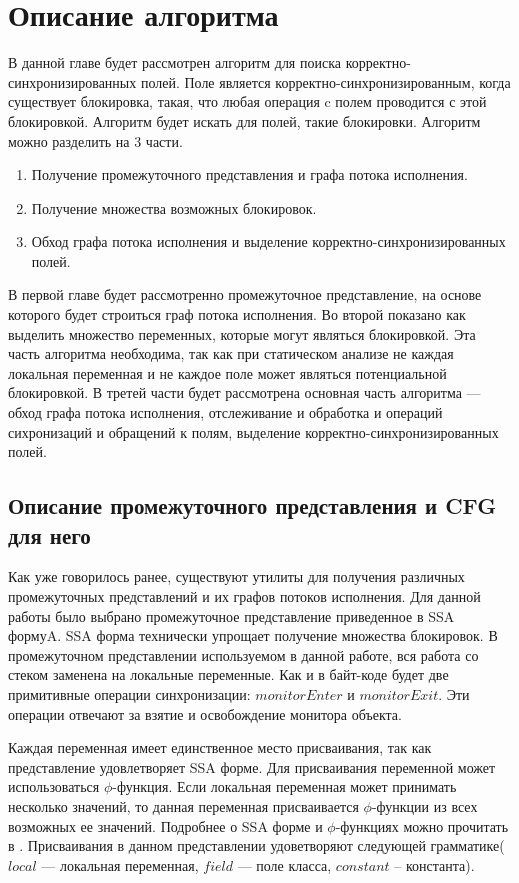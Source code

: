 \chapter{Описание алгоритма}


В данной главе будет рассмотрен алгоритм для поиска корректно-синхронизированных полей.
Поле является корректно-синхронизированным, когда существует блокировка, такая, что любая операция c полем проводится с этой блокировкой. Алгоритм будет искать для полей, такие блокировки. 
Алгоритм можно разделить на 3 части. 
\begin{enumerate}
\item Получение промежуточного представления и графа потока исполнения.
\item Получение множества возможных блокировок.
\item Обход графа потока исполнения и выделение корректно-синхронизированных полей.
\end{enumerate}

В первой главе будет рассмотренно промежуточное представление, на основе которого будет строиться граф потока исполнения. Во второй показано как выделить множество переменных, которые могут являться блокировкой. Эта часть алгоритма необходима, так как при статическом анализе не каждая локальная переменная и не каждое поле может являться потенциальной блокировкой. 
В третей части будет рассмотрена основная часть алгоритма --- обход графа потока исполнения, отслеживание и обработка и операций сихронизаций и обращений к полям, выделение корректно-синхронизированных полей.



\FloatBarrier
\section{Описание промежуточного представления и CFG для него}
Как уже говорилось ранее, существуют утилиты для получения различных промежуточных представлений и их графов потоков исполнения. 
Для данной работы было выбрано промежуточное представление приведенное в SSA формуA\cite{SSA}. SSA форма технически упрощает получение множества блокировок. В промежуточном представлении используемом в данной работе, вся работа со стеком заменена на локальные переменные. Как и в байт-коде будет две примитивные операции синхронизации: $monitorEnter$ и $monitorExit$. Эти операции отвечают за взятие и освобождение монитора объекта.

Каждая переменная имеет единственное место присваивания, так как представление удовлетворяет SSA форме. 
Для присваивания переменной может использоваться $\phi$-функция.
Если локальная переменная может принимать несколько значений, то данная переменная присваивается $\phi$-функции из всех возможных ее значений. Подробнее о SSA форме и $\phi$-функциях можно прочитать в \cite{SSA}.
Присваивания в данном представлении удоветворяют следующей грамматике($local$ --- локальная переменная, $field$ --- поле класса, $constant$ -- константа).

